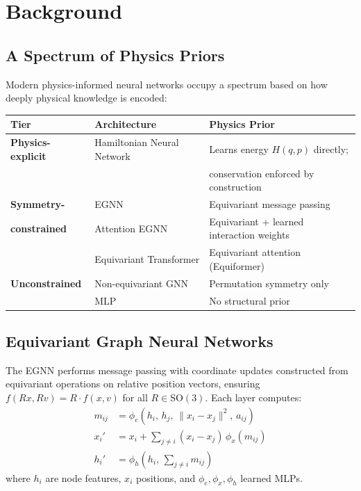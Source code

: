 \documentclass[12pt]{article}
\begin{document}
\section{Background}

\subsection{A Spectrum of Physics Priors}

Modern physics-informed neural networks occupy a spectrum based on how deeply
physical knowledge is encoded:

\begin{center} \renewcommand{\arraystretch}{1.3}
  \begin{tabular}{>{\bfseries}lll} \toprule Tier & Architecture & Physics Prior
    \\ \midrule Physics-explicit & Hamiltonian Neural Network & Learns energy
    $H(q,p)$ directly; \\ & & conservation enforced by construction \\ \midrule
    Symmetry-        & EGNN                       & Equivariant message passing
    \\ constrained      & Attention EGNN             & Equivariant + learned
    interaction weights \\ & Equivariant Transformer    & Equivariant attention
  (Equiformer) \\ \midrule Unconstrained    & Non-equivariant GNN        &
Permutation symmetry only \\ & MLP                        & No structural prior
\\ \bottomrule \end{tabular} \end{center}

\subsection{Equivariant Graph Neural Networks}

The EGNN \cite{satorras2021en} performs message passing with coordinate updates
    constructed from equivariant operations on relative position vectors,
    ensuring $f(Rx, Rv) = R \cdot f(x,v)$ for all $R \in \mathrm{SO}(3)$. Each
    layer computes: \begin{align} m_{ij} &= \phi_e(h_i,\, h_j,\, \|x_i -
    x_j\|^2,\, a_{ij}) \\ x_i'   &= x_i + \sum_{j \neq i} (x_i -
  x_j)\,\phi_x(m_{ij}) \\ h_i' &= \phi_h\!\left(h_i,\, \textstyle\sum_{j \neq i}
m_{ij}\right) \end{align} where $h_i$ are node features, $x_i$ positions, and
$\phi_e, \phi_x, \phi_h$ learned MLPs.
\end{document}

